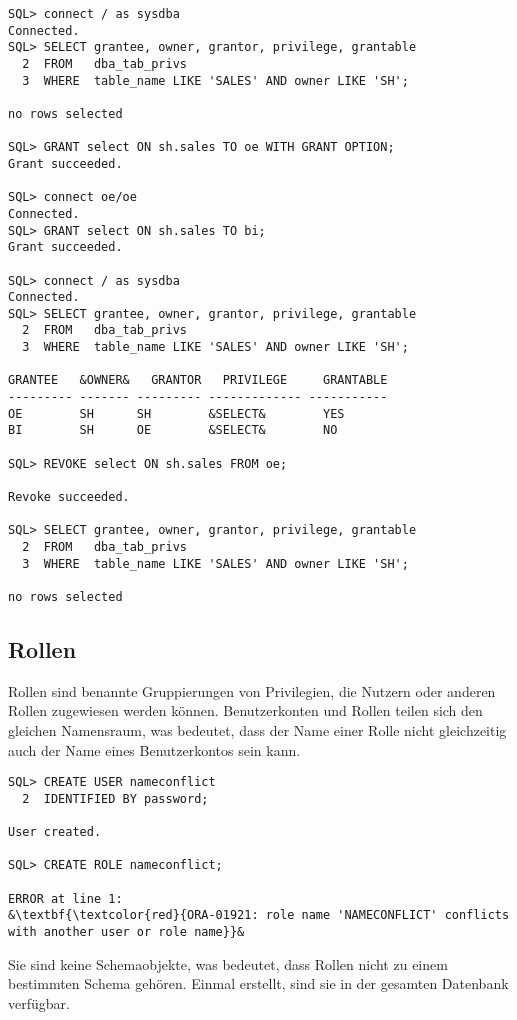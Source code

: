 \clearpage
          \begin{lstlisting}[caption={Entziehen von Objektprivilegien},label=admin245,language=oracle_sql,alsolanguage=sqlplus]
SQL> connect / as sysdba
Connected.
SQL> SELECT grantee, owner, grantor, privilege, grantable
  2  FROM   dba_tab_privs
  3  WHERE  table_name LIKE 'SALES' AND owner LIKE 'SH';

no rows selected

SQL> GRANT select ON sh.sales TO oe WITH GRANT OPTION;
Grant succeeded.

SQL> connect oe/oe
Connected.
SQL> GRANT select ON sh.sales TO bi;
Grant succeeded.

SQL> connect / as sysdba
Connected.
SQL> SELECT grantee, owner, grantor, privilege, grantable
  2  FROM   dba_tab_privs
  3  WHERE  table_name LIKE 'SALES' AND owner LIKE 'SH';

GRANTEE   &OWNER&   GRANTOR   PRIVILEGE     GRANTABLE
--------- ------- --------- ------------- -----------
OE        SH      SH        &SELECT&        YES
BI        SH      OE        &SELECT&        NO

SQL> REVOKE select ON sh.sales FROM oe;

Revoke succeeded.

SQL> SELECT grantee, owner, grantor, privilege, grantable
  2  FROM   dba_tab_privs
  3  WHERE  table_name LIKE 'SALES' AND owner LIKE 'SH';

no rows selected
          \end{lstlisting}
          \begin{literaturinternet}
            \item \cite{BABCIHGB}
          \end{literaturinternet}
      \subsection{Rollen}
        Rollen sind benannte Gruppierungen von Privilegien, die Nutzern oder anderen Rollen zugewiesen werden können. Benutzerkonten und Rollen teilen sich den gleichen Namensraum, was bedeutet, dass der Name einer Rolle nicht gleichzeitig auch der Name eines Benutzerkontos sein kann.
        \begin{lstlisting}[caption={Rollen und Benutzerkonten teilen sich den gleichen Namensraum},label=admin246,language=oracle_sql]
SQL> CREATE USER nameconflict
  2  IDENTIFIED BY password;

User created.

SQL> CREATE ROLE nameconflict;

ERROR at line 1:
&\textbf{\textcolor{red}{ORA-01921: role name 'NAMECONFLICT' conflicts with another user or role name}}&
        \end{lstlisting}
        Sie sind keine Schemaobjekte, was bedeutet, dass Rollen nicht zu einem bestimmten Schema gehören. Einmal erstellt, sind sie in der gesamten Datenbank verfügbar.
